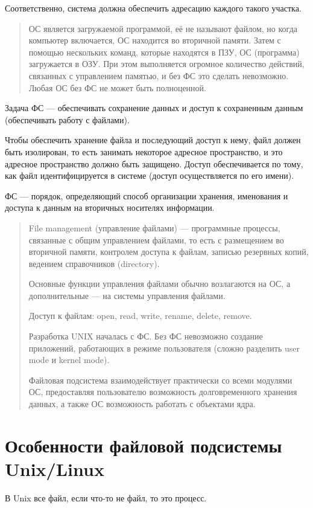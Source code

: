 Соответственно, система должна обеспечить адресацию каждого такого участка.

\begin{quote}
	ОС является загружаемой программой, её не называют файлом, но когда компьютер включается, ОС находится во вторичной памяти. Затем с помощью нескольких команд, которые находятся в ПЗУ, ОС (программа) загружается в ОЗУ. При этом выполняется огромное количество действий, связанных с управлением памятью, и без ФС это сделать невозможно. Любая ОС без ФС не может быть полноценной.
\end{quote}

Задача ФС --- обеспечивать сохранение данных и доступ к сохраненным данным (обеспечивать работу с файлами).

Чтобы обеспечить хранение файла и последующий доступ к нему, файл должен быть изолирован, то есть занимать некоторое адресное пространство, и это адресное пространство должно быть защищено. Доступ обеспечивается по тому, как файл идентифицируется в системе (доступ осуществляется по его имени).

ФС --- порядок, определяющий способ организации хранения, именования и доступа к данным на вторичных носителях информации.

\begin{quote}
	File management (управление файлами) --- программные процессы, связанные с общим управлением файлами, то есть с размещением во вторичной памяти, контролем доступа к файлам, записью резервных копий, ведением справочников (directory).
	
	Основные функции управления файлами обычно возлагаются на ОС, а дополнительные --- на системы управления файлами.
	
	Доступ к файлам: open, read, write, rename, delete, remove.
	
	Разработка UNIX началась с ФС. Без ФС невозможно создание приложений, работающих в режиме пользователя (сложно разделить user mode и kernel mode).
	
	Файловая подсистема взаимодействует практически со всеми модулями ОС, предоставляя пользователю возможность долговременного хранения данных, а также ОС возможность работать с объектами ядра.
\end{quote}

\section{Особенности файловой подсистемы \\ Unix/Linux}
В Unix все файл, если что-то не файл, то это процесс.

